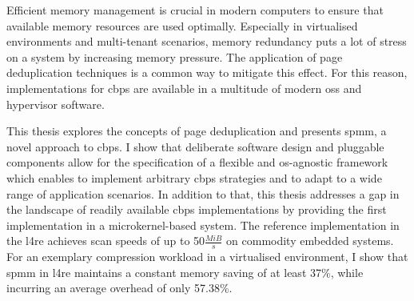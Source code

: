 Efficient memory management is crucial in modern computers to ensure that available memory resources are used optimally.
Especially in virtualised environments and multi-tenant scenarios, memory redundancy puts a lot of stress on a system by increasing memory pressure.
The application of page deduplication techniques is a common way to mitigate this effect.
For this reason, implementations for \ac{cbps} are available in a multitude of modern \acp{os} and hypervisor software.

This thesis explores the concepts of page deduplication and presents \acs{spmm}, a novel approach to \ac{cbps}.
I show that deliberate software design and pluggable components allow for the specification of a flexible and \ac{os}-agnostic framework which enables to implement arbitrary \ac{cbps} strategies and to adapt to a wide range of application scenarios.
In addition to that, this thesis addresses a gap in the landscape of readily available \ac{cbps} implementations by providing the first implementation in a microkernel-based system.
The reference implementation in the \acf{l4re} achieves scan speeds of up to 50$\frac{MiB}{s}$ on commodity embedded systems.
For an exemplary compression workload in a virtualised environment, I show that \acs{spmm} in \acs{l4re} maintains a constant memory saving of at least 37\%, while incurring an average overhead of only 57.38\%.
